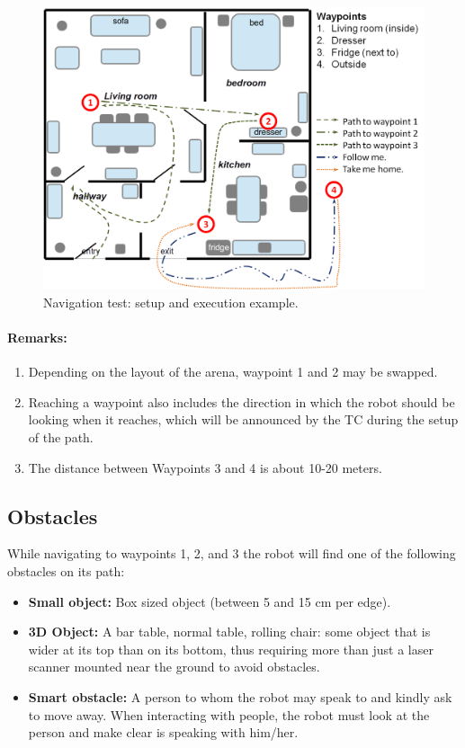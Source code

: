 \begin{figure}[tbp]
	\centering
	\includegraphics[width=0.5\columnwidth]{images/navigation.png}
	\caption{Navigation test: setup and execution example.}
	\label{fig:restaurant}
\end{figure}

\paragraph*{Remarks:}
\begin{enumerate}
	\item Depending on the layout of the arena, waypoint 1 and 2 may be swapped.
	\item Reaching a waypoint also includes the direction in which the robot should be looking when it reaches, which will be announced by the TC during the setup of the path.
	\item The distance between Waypoints 3 and 4 is about 10-20 meters.
\end{enumerate}

\subsection{Obstacles}
While navigating to waypoints 1, 2, and 3 the robot will find one of the following obstacles on its path:
\begin{itemize}
		\item \textbf{Small object:} Box sized object (between 5 and 15 cm per edge).  
		\item \textbf{3D Object:} A bar table, normal table, rolling chair: some object that is wider at its top than on its bottom, 
		  thus requiring more than just a laser scanner mounted near the ground to avoid obstacles.
		\item \textbf{Smart obstacle:} A person to whom the robot may speak to and kindly ask to move away. When interacting with people, the robot must look at the person and make clear is speaking with him/her.
	\end{itemize}

